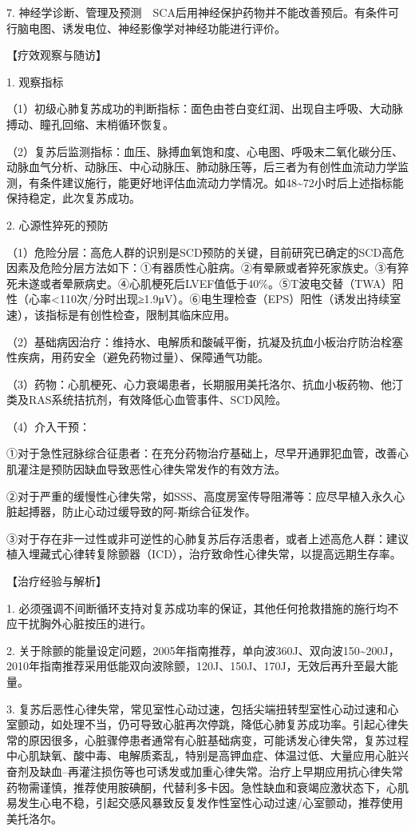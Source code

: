 7.
神经学诊断、管理及预测　SCA后用神经保护药物并不能改善预后。有条件可行脑电图、诱发电位、神经影像学对神经功能进行评价。

【疗效观察与随访】

1. 观察指标

（1）初级心肺复苏成功的判断指标：面色由苍白变红润、出现自主呼吸、大动脉搏动、瞳孔回缩、末梢循环恢复。

（2）复苏后监测指标：血压、脉搏血氧饱和度、心电图、呼吸末二氧化碳分压、动脉血气分析、动脉压、中心动脉压、肺动脉压等，后三者为有创性血流动力学监测，有条件建议施行，能更好地评估血流动力学情况。如48\textasciitilde{}72小时后上述指标能保持稳定，此次复苏成功。

2. 心源性猝死的预防

（1）危险分层：高危人群的识别是SCD预防的关键，目前研究已确定的SCD高危因素及危险分层方法如下：①有器质性心脏病。②有晕厥或者猝死家族史。③有猝死未遂或者晕厥病史。④心肌梗死后LVEF值低于40\%。⑤T波电交替（TWA）阳性（心率\textless{}110次/分时出现≥1.9μV）。⑥电生理检查（EPS）阳性（诱发出持续室速），该指标是有创性检查，限制其临床应用。

（2）基础病因治疗：维持水、电解质和酸碱平衡，抗凝及抗血小板治疗防治栓塞性疾病，用药安全（避免药物过量）、保障通气功能。

（3）药物：心肌梗死、心力衰竭患者，长期服用美托洛尔、抗血小板药物、他汀类及RAS系统拮抗剂，有效降低心血管事件、SCD风险。

（4）介入干预：

①对于急性冠脉综合征患者：在充分药物治疗基础上，尽早开通罪犯血管，改善心肌灌注是预防因缺血导致恶性心律失常发作的有效方法。

②对于严重的缓慢性心律失常，如SSS、高度房室传导阻滞等：应尽早植入永久心脏起搏器，防止心动过缓导致的阿-斯综合征发作。

③对于存在非一过性或非可逆性的心肺复苏后存活患者，或者上述高危人群：建议植入埋藏式心律转复除颤器（ICD），治疗致命性心律失常，以提高远期生存率。

【治疗经验与解析】

1.
必须强调不间断循环支持对复苏成功率的保证，其他任何抢救措施的施行均不应干扰胸外心脏按压的进行。

2.
关于除颤的能量设定问题，2005年指南推荐，单向波360J、双向波150\textasciitilde{}200J，2010年指南推荐采用低能双向波除颤，120J、150J、170J，无效后再升至最大能量。

3.
复苏后恶性心律失常，常见室性心动过速，包括尖端扭转型室性心动过速和心室颤动，如处理不当，仍可导致心脏再次停跳，降低心肺复苏成功率。引起心律失常的原因很多，心脏骤停患者通常有心脏基础病变，可能诱发心律失常，复苏过程中心肌缺氧、酸中毒、电解质紊乱，特别是高钾血症、体温过低、大量应用心脏兴奋剂及缺血--再灌注损伤等也可诱发或加重心律失常。治疗上早期应用抗心律失常药物需谨慎，推荐使用胺碘酮，代替利多卡因。急性缺血和衰竭应激状态下，心肌易发生心电不稳，引起交感风暴致反复发作性室性心动过速/心室颤动，推荐使用美托洛尔。

